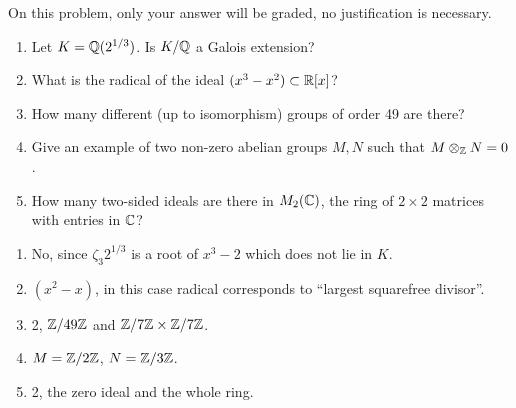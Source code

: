 \begin{question}[subtitle=August 2022 Problem 1,ID=Aug22_1]
On this problem, only your answer will be graded, no justification is necessary.
\begin{enumerate}
    \item Let $K = \mathbb{Q}(2^{1/3})$. Is $K/\mathbb{Q}$ a Galois extension?
    \item What is the radical of the ideal $(x^3-x^2) \subset \mathbb{R}[x]$?
    \item How many different (up to isomorphism) groups of order 49 are there?
    \item Give an example of two non-zero abelian groups $M, N$ such that $M \otimes_{\mathbb{Z}} N = 0$.
    \item How many two-sided ideals are there in $M_2(\mathbb{C})$, the ring of $2 \times 2$ matrices with entries in $\mathbb{C}$?
\end{enumerate}
\end{question}
\begin{solution}
\begin{enumerate}
    \item No, since $\zeta_3 2^{1/3}$ is a root of $x^3-2$ which does not lie in $K$.
    \item $(x^2-x)$, in this case radical corresponds to ``largest squarefree divisor''.
    \item 2, $\mathbb{Z}/49\mathbb{Z}$ and $\mathbb{Z}/7\mathbb{Z} \times \mathbb{Z}/7\mathbb{Z}$.
    \item $M = \mathbb{Z}/2\mathbb{Z}$, $N = \mathbb{Z}/3\mathbb{Z}$.
    \item 2, the zero ideal and the whole ring.
\end{enumerate}
\end{solution}


